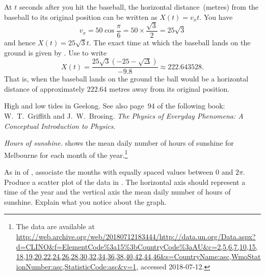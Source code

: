 \documentclass[a4paper,oneside,12pt]{article}
\begin{document}
\begin{problem}
{\begin{solution}
At $t$ seconds after you hit the baseball, the horizontal
distance~(metres) from the baseball to its original position can be
written as $X(t) = v_x t$.  You have
\[
v_x
=
50 \cos\frac{\pi}{6}
=
50 \times \frac{\sqrt{3}}{2}
=
25\sqrt{3}
\]
and hence $X(t) = 25\sqrt{3} t$.  The exact time at which the baseball
lands on the ground is given by
.  Use
 to write
\[
X(t)
=
\frac{
  25\sqrt{3} (-25 - \sqrt{\Delta})
}{
  -9.8
}
\approx
222.643528.
\]
That is, when the baseball lands on the ground the ball would be a
horizontal distance of approximately $222.64$ metres away from its
original position.
\end{solution}
}{}

\item High and low tides in Geelong.  See also page~94 of the
  following book: W.~T.~Griffith and J.~W.~Brosing.  \emph{The Physics
    of Everyday Phenomena: A Conceptual Introduction to Physics}.

\begin{table}[!htbp]
\centering

\caption{%
  The mean daily number of hours of sunshine for the city of
  Melbourne, Victoria, Australia.  The mean for each month was
  calculated using data for the years from $1961$ to $1990$.  The mean
  values are provided by the United Nations.
}
\label{tab:trigonometric:mean_daily_sunshine}
\end{table}

\item\emph{Hours of sunshine.}
   shows the mean
  daily number of hours of sunshine for Melbourne for each month of
  the year.\footnote{
    The data are available at
    \url{http://web.archive.org/web/20180712183444/http://data.un.org/Data.aspx?d=CLINO\&f=ElementCode\%3a15\%3bCountryCode\%3aAU\&c=2,5,6,7,10,15,18,19,20,22,24,26,28,30,32,34,36,38,40,42,44,46\&s=CountryName:asc,WmoStationNumber:asc,StatisticCode:asc\&v=1},
    accessed 2018-07-12.
  }
  \begin{packedenum}
  \item\label{subprob:trigonometric:mean_daily_sunshine_graph}
    As in  of
    , associate the
    months with equally spaced values between $0$ and $2\pi$.  Produce
    a scatter plot of the data in
    .  The horizontal
    axis should represent a time of the year and the vertical axis the
    mean daily number of hours of sunshine.  Explain what you notice
    about the graph.


\end{packedenum}
\end{problem}
\end{document}
